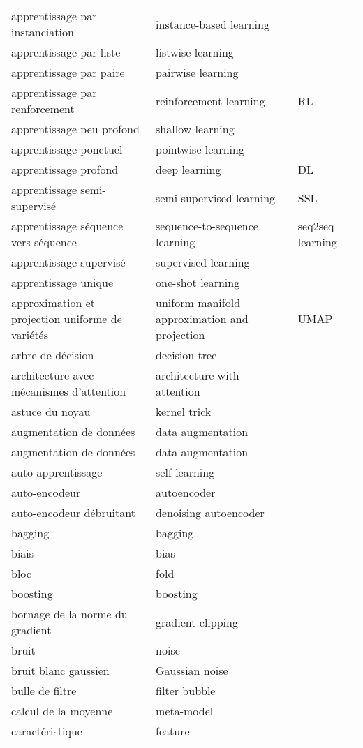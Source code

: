 \begin{longtable}{p{} p{} p{}}
apprentissage par instanciation & instance-based learning &  \\ 
apprentissage par liste & listwise learning &  \\ 
apprentissage par paire & pairwise learning &  \\ 
apprentissage par renforcement & reinforcement learning & RL \\ 
apprentissage peu profond & shallow learning &  \\ 
apprentissage ponctuel & pointwise learning &  \\ 
apprentissage profond & deep learning & DL \\ 
apprentissage semi-supervisé & semi-supervised learning & SSL \\ 
apprentissage séquence vers séquence & sequence-to-sequence learning & seq2seq learning \\ 
apprentissage supervisé & supervised learning &  \\ 
apprentissage unique & one-shot learning &  \\ 
approximation et projection uniforme de variétés & uniform manifold approximation and projection & UMAP \\ 
arbre de décision & decision tree &  \\ 
architecture avec mécanismes d’attention & architecture with attention &  \\ 
astuce du noyau & kernel trick &  \\ 
augmentation de données & data augmentation &  \\ 
augmentation de données & data augmentation &  \\ 
auto-apprentissage & self-learning &  \\ 
auto-encodeur & autoencoder &  \\ 
auto-encodeur débruitant & denoising autoencoder &  \\ 
bagging & bagging &  \\ 
biais & bias &  \\ 
bloc & fold &  \\ 
boosting & boosting &  \\ 
bornage de la norme du gradient & gradient clipping &  \\ 
bruit & noise &  \\ 
bruit blanc gaussien & Gaussian noise &  \\ 
bulle de filtre & filter bubble &  \\ 
calcul de la moyenne & meta-model &  \\ 
caractéristique & feature &  \\ 

\end{longtable}
